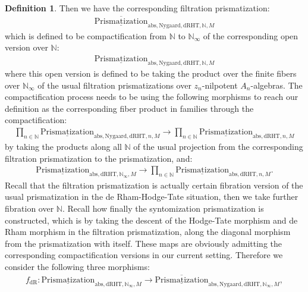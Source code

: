 \documentclass[12pt]{article}
\theoremstyle{definition}
\newtheorem{definition}{Definition}
\begin{document}
\begin{definition}
Then we have the corresponding filtration prismatization:
\begin{align}
\overline{\underline{\mathrm{Prismatization}}}_{\mathrm{abs},\mathrm{Nygaard},\mathrm{dRHT},\mathbb{N},M}
\end{align}
which is defined to be compactification from $\mathbb{N}$ to $\mathbb{N}_\infty$ of the corresponding open version over $\mathbb{N}$:
\begin{align}
{\underline{\mathrm{Prismatization}}}_{\mathrm{abs},\mathrm{Nygaard},\mathrm{dRHT},\mathbb{N},M}
\end{align}
where this open version is defined to be taking the product over the finite fibers over $\mathbb{N}_\infty$ of the usual filtration prismatizations over $z_n$-nilpotent $A_n$-algebras. The compactification process needs to be using the following morphisms to reach our definition as the corresponding fiber product in families through the compactification:
\begin{align}
\prod_{n\in \mathbb{N}} {\underline{\mathrm{Prismatization}}}_{\mathrm{abs},\mathrm{Nygaard},\mathrm{dRHT},n,M}\rightarrow  \prod_{n\in \mathbb{N}} {\underline{\mathrm{Prismatization}}}_{\mathrm{abs},\mathrm{dRHT},n,M}
\end{align}
by taking the products along all $\mathbb{N}$ of the usual projection from the corresponding filtration prismatization to the prismatization, and:
\begin{align}
{\underline{\mathrm{Prismatization}}}_{\mathrm{abs},\mathrm{dRHT},\mathbb{N}_\infty,M}\rightarrow  \prod_{n\in \mathbb{N}} {\underline{\mathrm{Prismatization}}}_{\mathrm{abs},\mathrm{dRHT},n,M}.
\end{align}
Recall that the filtration prismatization is actually certain fibration version of the usual prismatization in the de Rham-Hodge-Tate situation, then we take further fibration over $\mathbb{N}$. Recall how finally the syntomization prismatization is constructed, which is by taking the descent of the Hodge-Tate morphism and de Rham morphism in the filtration prismatization, along the diagonal morphism from the prismatization with itself. These maps are obviously admitting the corresponding compactification versions in our current setting. Therefore we consider the following three morphisms:
\begin{align}
f_\mathrm{dR}: {\underline{\mathrm{Prismatization}}}_{\mathrm{abs},\mathrm{dRHT},\mathbb{N}_\infty,M}\rightarrow \overline{\underline{\mathrm{Prismatization}}}_{\mathrm{abs},\mathrm{Nygaard},\mathrm{dRHT},\mathbb{N}_\infty,M},

\end{align}
\end{definition}
\end{document}
